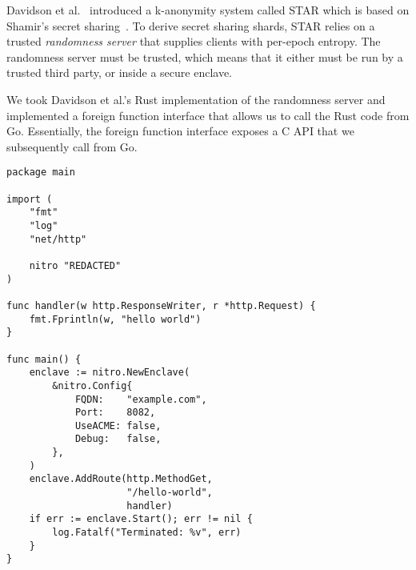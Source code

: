 Davidson et al.~\cite{Davidson2021a} introduced a k-anonymity system called STAR which is based on Shamir's secret sharing~\cite{Shamir79a}.  To derive secret sharing shards, STAR relies on a trusted \emph{randomness server} that supplies clients with per-epoch entropy.  The randomness server must be trusted, which means that it either must be run by a trusted third party, or inside a secure enclave.


We took Davidson et al.'s Rust implementation of the randomness server and implemented a foreign function interface that allows us to call the Rust code from Go.  Essentially, the foreign function interface exposes a C API that we subsequently call from Go.

\begin{lstlisting}
package main

import (
    "fmt"
    "log"
    "net/http"

    nitro "REDACTED"
)

func handler(w http.ResponseWriter, r *http.Request) {
    fmt.Fprintln(w, "hello world")
}

func main() {
    enclave := nitro.NewEnclave(
        &nitro.Config{
            FQDN:    "example.com",
            Port:    8082,
            UseACME: false,
            Debug:   false,
        },
    )
    enclave.AddRoute(http.MethodGet,
                     "/hello-world",
                     handler)
    if err := enclave.Start(); err != nil {
        log.Fatalf("Terminated: %v", err)
    }
}
\end{lstlisting}